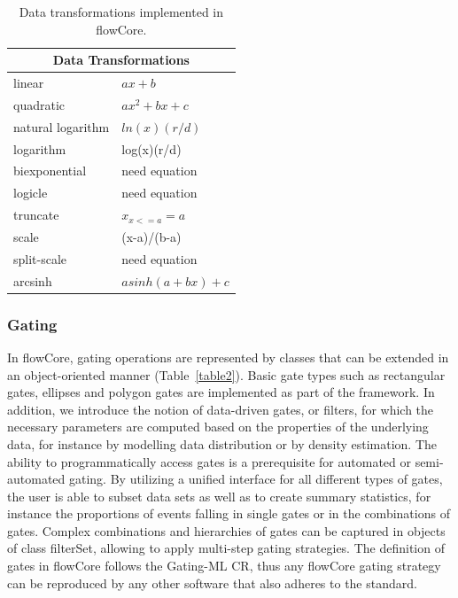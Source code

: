 \documentclass[12pt]{article}
\begin{document}
\begin{table}[ht]
\begin{center}
\begin{tabular}{|l|l|}
\hline
\multicolumn{2}{|c|}{Data Transformations} \\
\hline
linear & $ax + b$ \\
quadratic & $ax^2 + bx + c$ \\
natural logarithm & $ln(x)(r/d)$ \\
logarithm & log(x)(r/d) \\
biexponential & need equation \\
logicle& need equation \\
truncate & $x_{x<=a} = a$ \\
scale & (x-a)/(b-a) \\
split-scale & need equation \\
arcsinh & $asinh(a + bx)+c$ \\
\hline
\end{tabular}
\caption{\label{table1}Data transformations implemented in flowCore.}
\end{center}
\end{table}

\subsubsection*{Gating}
In flowCore, gating operations are represented by classes that can be
extended in an object-oriented manner (Table~\ref{table2}). Basic gate
types such as rectangular gates, ellipses and polygon gates are
implemented as part of the framework. In addition, we introduce the
notion of data-driven gates, or filters, for which the necessary
parameters are computed based on the properties of the underlying
data, for instance by modelling data distribution or by density
estimation. The ability to programmatically access gates is a
prerequisite for automated or semi-automated gating. By utilizing a
unified interface for all different types of gates, the user is able
to subset data sets as well as to create summary statistics, for
instance the proportions of events falling in single gates or in the
combinations of gates. Complex combinations and hierarchies of gates
can be captured in objects of class filterSet, allowing to apply
multi-step gating strategies. The definition of gates in flowCore
follows the Gating-ML CR, thus any flowCore gating strategy can be
reproduced by any other software that also adheres to the standard.
\end{document}
